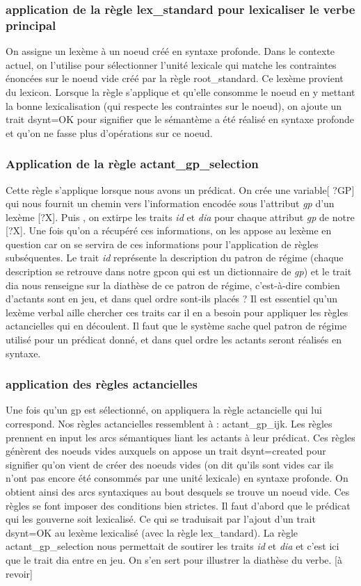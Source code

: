 \subsubsection{application de la règle lex{\_}standard pour lexicaliser le verbe principal}
On assigne un lexème à un noeud  créé en syntaxe profonde. Dans le contexte actuel, on l'utilise pour sélectionner l'unité lexicale qui matche les contraintes énoncées sur le noeud vide créé par la règle root{\_}standard. Ce lexème provient du lexicon. Lorsque la règle s'applique et qu'elle consomme le noeud en y mettant la bonne lexicalisation (qui respecte les contraintes sur le noeud), on ajoute un trait dsynt=OK pour signifier que le sémantème a été réalisé en syntaxe profonde et qu'on ne fasse plus d'opérations sur ce noeud.

\subsubsection{Application de la règle actant{\_}gp{\_}selection}
Cette règle s'applique lorsque nous avons un prédicat.
On crée une variable[ ?GP] qui nous fournit un chemin vers l'information encodée sous l'attribut \emph{ gp} d'un lexème [?X]. Puis , on extirpe les traits \emph{ id} et \emph{dia} pour chaque attribut\emph{ gp} de notre [?X]. Une fois qu'on a récupéré ces informations, on les appose au lexème en question car on se servira de ces informations pour l'application de règles subséquentes. Le trait \emph{ id} représente la description du patron de régime (chaque description se retrouve dans notre gpcon qui est un dictionnaire de\emph{ gp}) et le trait dia nous renseigne sur la diathèse de ce patron de régime, c'est-à-dire combien d'actants sont en jeu, et dans quel ordre sont-ils placés ? Il est essentiel qu'un lexème verbal aille chercher ces traits car il en a besoin pour appliquer les règles actancielles qui en découlent. Il faut que le système sache quel patron de régime utilisé pour un prédicat donné, et dans quel ordre les actants seront réalisés en syntaxe.

\subsubsection{application des règles actancielles}
Une fois qu'un gp est sélectionné, on appliquera la règle actancielle qui lui correspond. Nos règles actancielles ressemblent à : actant{\_}gp{\_}ijk. Les règles prennent en input les arcs sémantiques liant les actants à leur prédicat. Ces règles génèrent des noeuds vides auxquels on appose un trait dsynt=created pour signifier qu'on vient de créer des noeuds vides (on dit qu'ils sont vides car ils n'ont pas encore été consommés par une unité lexicale) en syntaxe profonde. On obtient ainsi des arcs syntaxiques au bout desquels se trouve un noeud vide. Ces règles se font imposer des conditions bien strictes. Il faut d'abord que le prédicat qui les gouverne soit lexicalisé. Ce qui se traduisait par l'ajout d'un trait dsynt=OK au lexème lexicalisé (avec la règle lex{\_}tandard). La règle actant{\_}gp{\_}selection nous permettait de soutirer les traits  \emph{ id} et \emph{dia} et c'est ici que le trait dia entre en jeu. On s'en sert pour illustrer la diathèse du verbe. [à revoir]

